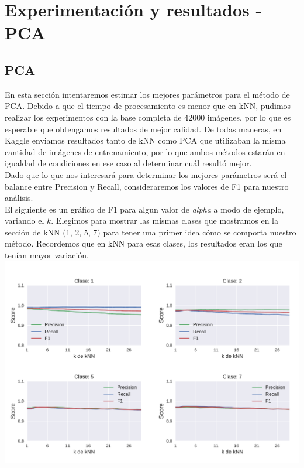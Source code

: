 
\section{Experimentación y resultados - PCA}

\subsection{PCA}

En esta sección intentaremos estimar los mejores parámetros para el método de PCA. Debido a que el tiempo de procesamiento es menor que en kNN, pudimos realizar los experimentos con la base completa de 42000 imágenes, por lo que es esperable que obtengamos resultados de mejor calidad. De todas maneras, en Kaggle enviamos resultados tanto de kNN como PCA que utilizaban la misma cantidad de imágenes de entrenamiento, por lo que ambos métodos estarán en igualdad de condiciones en ese caso al determinar cuál resultó mejor. \\

Dado que lo que nos interesará para determinar los mejores parámetros será el balance entre Precision y Recall, consideraremos los valores de F1 para nuestro análisis.  \\

El siguiente es un gráfico de F1 para algun valor de \textit{alpha} a modo de ejemplo, variando el $k$. Elegimos para mostrar las mismas clases que mostramos en la sección de kNN (1, 2, 5, 7) para tener una primer idea cómo se comporta nuestro método. Recordemos que en kNN para esas clases, los resultados eran los que tenían mayor variación. \\

{\centering
    \includegraphics[scale=0.65]{informe/imagenes/pca/variacionKClases1257PresRecall.pdf} \\
}
$ $\newline


